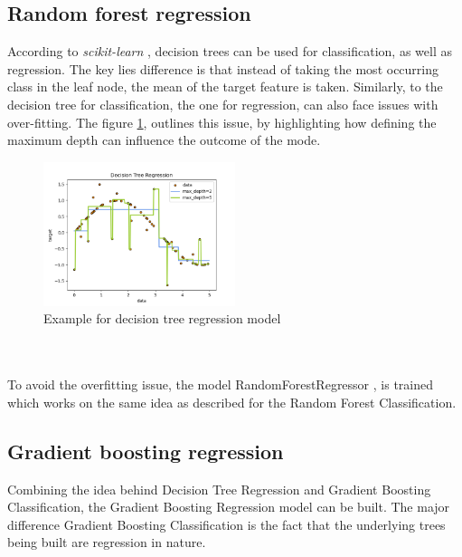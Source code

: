 \subsection{Random forest regression}
According to \textit{scikit-learn} \parencite{sklearne87:online}, decision trees can be used for classification, as well as regression. The key lies difference is that instead of taking the most occurring class in the leaf node, the mean of the target feature is taken. Similarly, to the decision tree for classification, the one for regression, can also face issues with over-fitting. The figure \ref{fig:regtree}, outlines this issue, by highlighting how defining the maximum depth can influence the outcome of the mode.
\begin{figure}[h]
      \centering
      \includegraphics[width=0.5\textwidth]{images/regression_tree.png}
      \caption{Example for decision tree regression model \parencite{110Decis87:online} }
      \label{fig:regtree}
  \end{figure}
\\\\
To avoid the overfitting issue, the model RandomForestRegressor \parencite{sklearne87:online}, is trained which works on the same idea as described for the Random Forest Classification. 

\subsection{Gradient boosting regression}
Combining the idea behind Decision Tree Regression and Gradient Boosting Classification, the Gradient Boosting Regression model can be built. The major difference Gradient Boosting Classification is the fact that the underlying trees being built are regression in nature. 


